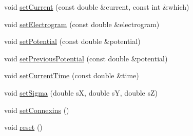 \begin{DoxyCompactItemize}
\item 
void \hyperlink{class_oscillator_a5e4ecacba9fc577660c1643c1e50e0bb}{set\+Current} (const double \&current, const int \&which)
\item 
void \hyperlink{class_oscillator_a42171f7e11ac041ab982d055ba389352}{set\+Electrogram} (const double \&electrogram)
\item 
void \hyperlink{class_oscillator_a91b56c7ed7c11f30109e8b1db296b2a6}{set\+Potential} (const double \&potential)
\item 
void \hyperlink{class_oscillator_a3e24a7637ed5aaf05101f3e115ea8e9c}{set\+Previous\+Potential} (const double \&potential)
\item 
void \hyperlink{class_oscillator_ae4fdf768b4fc00f6830c295cdc2f3e62}{set\+Current\+Time} (const double \&time)
\item 
void \hyperlink{class_oscillator_a549fcc8c0dc9a0789a062a0b1062610b}{set\+Sigma} (double s\+X, double s\+Y, double s\+Z)
\item 
void \hyperlink{class_oscillator_a8d4b8d2c8eb200afbbb4d4d999f068ab}{set\+Connexins} ()
\item 
void \hyperlink{class_oscillator_aa948fd93ed91ffedd873c6d50bba3898}{reset} ()
\end{DoxyCompactItemize}
